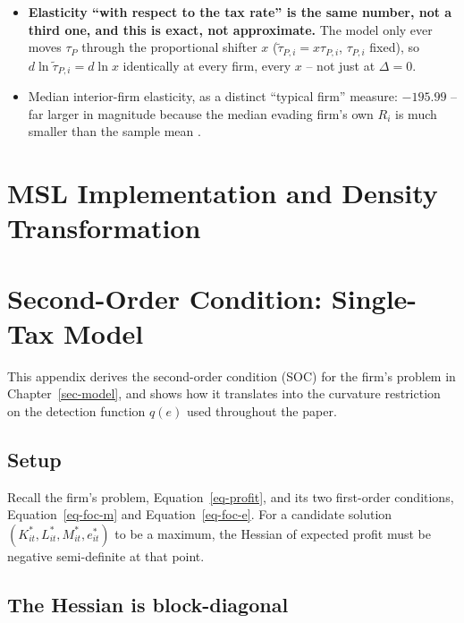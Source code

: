 \documentclass[
  12pt,
  letterpaper,
  oneside,
  openany]{report}
\providecommand{\tightlist}{%
  \setlength{\itemsep}{0pt}\setlength{\parskip}{0pt}}
\begin{document}
\begin{itemize}
\tightlist
\item
  \textbf{Elasticity ``with respect to the tax rate'' is the same
  number, not a third one, and this is exact, not approximate.} The
  model only ever moves \(\tau_P\) through the proportional shifter
  \(x\) (\(\tilde\tau_{P,i}=x\tau_{P,i}\), \(\tau_{P,i}\) fixed), so
  \(d\ln\tilde\tau_{P,i}=d\ln x\) identically at every firm, every \(x\)
  -- not just at \(\Delta=0\).
\item
  Median interior-firm elasticity, as a distinct ``typical firm''
  measure: \(-195.99\) -- far larger in magnitude because the median
  evading firm's own \(R_i\) is much smaller than the sample mean .
\end{itemize}

\chapter{MSL Implementation and Density
Transformation}\label{sec-app-msl}


\chapter{Second-Order Condition: Single-Tax
Model}\label{sec-app-soc-model}


This appendix derives the second-order condition (SOC) for the firm's
problem in Chapter~\ref{sec-model}, and shows how it translates into the
curvature restriction on the detection function \(q(e)\) used throughout
the paper.

\section{Setup}\label{setup-2}

Recall the firm's problem, Equation~\ref{eq-profit}, and its two
first-order conditions, Equation~\ref{eq-foc-m} and
Equation~\ref{eq-foc-e}. For a candidate solution
\((K_{it}^*,L_{it}^*,M_{it}^*,e_{it}^*)\) to be a maximum, the Hessian
of expected profit must be negative semi-definite at that point.

\section{The Hessian is
block-diagonal}\label{the-hessian-is-block-diagonal}
\end{document}
